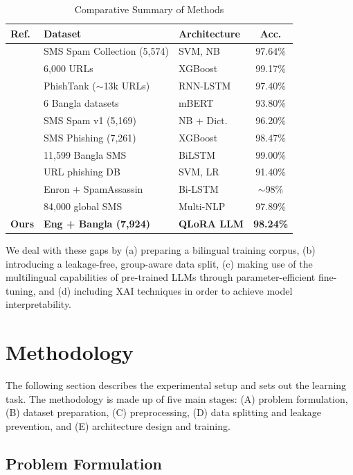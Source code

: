 \documentclass[journal]{IEEEtran}
\begin{document}
\begin{table}[htbp]
\caption{Comparative Summary of Methods}
\label{tab:comparative}
\centering
\begin{tabular}{lllc}
\toprule
\textbf{Ref.} & \textbf{Dataset} & \textbf{Architecture} & \textbf{Acc.} \\
\midrule
\cite{ref1} & SMS Spam Collection (5,574) & SVM, NB & 97.64\% \\
\cite{ref2} & 6,000 URLs & XGBoost & 99.17\% \\
\cite{ref3} & PhishTank ($\sim$13k URLs) & RNN-LSTM & 97.40\% \\
\cite{ref4} & 6 Bangla datasets & mBERT & 93.80\% \\
\cite{ref5} & SMS Spam v1 (5,169) & NB + Dict. & 96.20\% \\
\cite{ref6} & SMS Phishing (7,261) & XGBoost & 98.47\% \\
\cite{ref7} & 11,599 Bangla SMS & BiLSTM & 99.00\% \\
\cite{ref8} & URL phishing DB & SVM, LR & 91.40\% \\
\cite{ref9} & Enron + SpamAssassin & Bi-LSTM & $\sim$98\% \\
\cite{ref10} & 84,000 global SMS & Multi-NLP & 97.89\% \\
\textbf{Ours} & \textbf{Eng + Bangla (7,924)} & \textbf{QLoRA LLM} & \textbf{98.24\%} \\
\bottomrule
\end{tabular}
\end{table}

We deal with these gaps by (a) preparing a bilingual training corpus, (b) introducing a leakage-free, group-aware data split, (c) making use of the multilingual capabilities of pre-trained LLMs through parameter-efficient fine-tuning, and (d) including XAI techniques in order to achieve model interpretability.



\section{Methodology}

The following section describes the experimental setup and sets out the learning task. The methodology is made up of five main stages: (A) problem formulation, (B) dataset preparation, (C) preprocessing, (D) data splitting and leakage prevention, and (E) architecture design and training.

\subsection{Problem Formulation}
\end{document}
